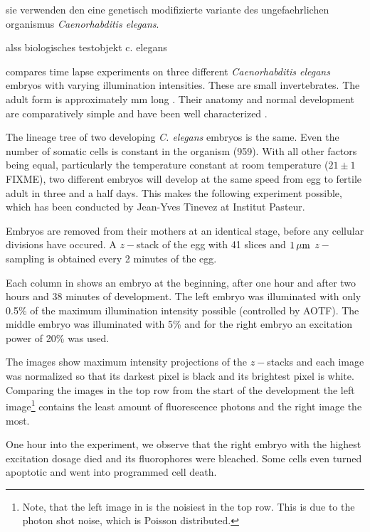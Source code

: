 sie verwenden den eine genetisch modifizierte variante des
ungefaehrlichen organismus \emph{Caenorhabditis elegans}.

alss biologisches testobjekt c. elegans



 compares time lapse experiments on three    
different \emph{Caenorhabditis elegans} embryos with varying
illumination intensities. These are small invertebrates. The adult
form is approximately \unit[1]{mm} long . Their anatomy and normal
development are comparatively simple and have been well characterized
\citep{Durbin1987}.

The lineage tree of two developing \emph{C. elegans} embryos is the     
same.  Even the number of somatic cells is constant in the organism
(959). With all other factors being equal, particularly the
temperature constant at room temperature ($21\pm 1$ FIXME), two different
embryos will develop at the same speed from egg to fertile adult in
three and a half days. This makes the following experiment possible,
which has been conducted by Jean-Yves Tinevez at Institut Pasteur.

Embryos are removed from their mothers at an identical stage, before    
any cellular divisions have occured. A $z-$stack of the egg with 41
slices and $\unit[1]{\mu m}$ $z-$sampling is obtained every 2 minutes
of the egg.

Each column in  shows an embryo at the     
beginning, after one hour and after two hours and 38 minutes of
development. The left embryo was illuminated with only 0.5\% of the
maximum illumination intensity possible (controlled by AOTF). The
middle embryo was illuminated with 5\% and for the right embryo an
excitation power of 20\% was used.

The images show maximum intensity projections of the $z-$stacks and     
each image was normalized so that its darkest pixel is black and its
brightest pixel is white. Comparing the images in the top row from the
start of the development the left image\footnote{Note, that the left
  image in  is the noisiest in the top
  row. This is due to the photon shot noise, which is Poisson
  distributed.} contains the least amount of fluorescence photons and
the right image the most.

One hour into the experiment, we observe that the right embryo with
the highest excitation dosage died and its fluorophores were bleached.
Some cells even turned apoptotic and went into programmed cell death.


